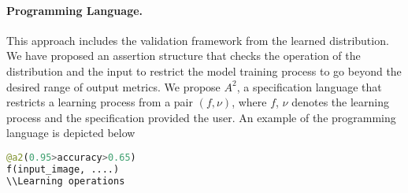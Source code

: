 \paragraph{Programming Language.} This approach includes the validation framework from the learned distribution. We have proposed an assertion structure that checks the operation of the distribution and the input to restrict the model training process to go beyond the desired range of output metrics. We propose $A^2$, a specification language that restricts a learning process from a pair $(f,\nu)$, where $f$, $\nu$ denotes the learning process and the specification provided the user. An example of the programming language is depicted below
\begin{lstlisting}[language=Python, caption=Accountable specification language]
@a2(0.95>accuracy>0.65)
f(input_image, ....)
\\Learning operations
\end{lstlisting}